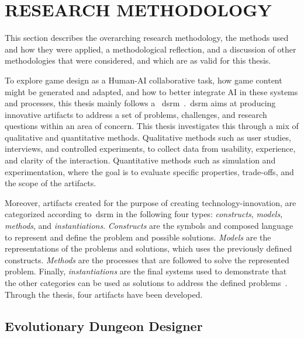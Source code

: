 \section{RESEARCH METHODOLOGY} \normalfont 
\label{sec:method}

This section describes the overarching research methodology, the methods used and how they were applied, a methodological reflection, and a discussion of other methodologies that were considered, and which are as valid for this thesis. 


To explore game design as a Human-AI collaborative task, how game content might be generated and adapted, and how to better integrate AI in these systems and processes, this thesis mainly follows a ~\acrfull{dsrm}~\cite{DSRM-Hevner}.~\acrshort{dsrm} aims at producing innovative artifacts to address a set of problems, challenges, and research questions within an area of concern. This thesis investigates this through a mix of qualitative and quantitative methods. Qualitative methods such as user studies, interviews, and controlled experiments, to collect data from usability, experience, and clarity of the interaction. Quantitative methods such as simulation and experimentation, where the goal is to evaluate specific properties, trade-offs, and the scope of the artifacts. 

Moreover, artifacts created for the purpose of creating technology-innovation, are categorized according to~\acrshort{dsrm} in the following four types: \emph{constructs}, \emph{models}, \emph{methods}, and \emph{instantiations}. \emph{Constructs} are the symbols and composed language to represent and define the problem and possible solutions. \emph{Models} are the representations of the problems and solutions, which uses the previously defined constructs. \emph{Methods} are the processes that are followed to solve the represented problem. Finally, \emph{instantiations} are the final systems used to demonstrate that the other categories can be used as solutions to address the defined problems~\cite{DSRM-Hevner}. Through the thesis, four artifacts have been developed.


\subsection{Evolutionary Dungeon Designer}

